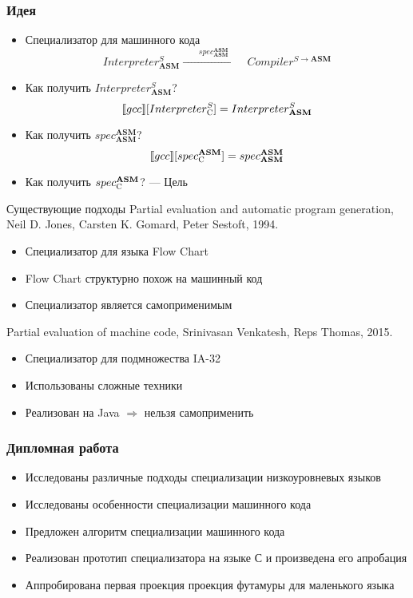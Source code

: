 \documentclass{beamer}
\begin{document}
\begin{frame}\frametitle{Идея}
  \begin{itemize}
  \item {Специализатор для машинного кода
      $$Interpreter^{S}_{\mathbf{ASM}}
      \xrightarrow{\qquad spec^{ \mathbf{ASM}}_{\mathbf{ASM}}\qquad} Compiler^{S \to \mathbf{ASM}}$$
    }
    \vfill
  \item {Как получить $Interpreter^{S}_{\mathbf{ASM}}$?
      $$\llbracket gcc \rrbracket [Interpreter^{S}_{\textsc{C}}] =
      Interpreter^{S}_{\mathbf{ASM}}$$}
    \vfill
  \item {Как получить $spec^{\mathbf{ASM}}_{\mathbf{ASM}}$?
      $$\llbracket gcc \rrbracket [spec^{ \mathbf{ASM}}_{\textsc{C}}] =
      spec^{\mathbf{ASM}}_{\mathbf{ASM}}$$}
    \vfill
  \item{Как получить $spec^{\mathbf{ASM}}_{\textsc{C}}$? \pause \hfill {\large \color{red} --- \hfill Цель} \hfill}
    \vfill
  \end{itemize}
\end{frame}

\begin{frame}{Существующие подходы}
	Partial evaluation and automatic program generation, 
	Neil D. Jones, Carsten K. Gomard, Peter Sestoft, 1994. 
    \begin{itemize}
    \vfill
    \item Специализатор для языка Flow Chart
    \vfill
    \item Flow Chart структурно похож на машинный код
    \vfill
    \item Специализатор является самоприменимым
  	\end{itemize}
  \vfill
    Partial evaluation of machine code,
    Srinivasan Venkatesh, Reps Thomas, 2015.
    \vfill
    \begin{itemize}
    \item Специализатор для подмножества IA-32
    \vfill
    \item Использованы сложные техники
    \vfill
    \item Реализован на Java $\Rightarrow$ нельзя самоприменить
  	\end{itemize}
\end{frame}

\begin{frame}[fragile]\frametitle{Дипломная работа}
\begin{itemize}
\item Исследованы различные подходы специализации низкоуровневых языков
\vfill
\item Исследованы особенности специализации машинного кода
\vfill
\item Предложен алгоритм специализации машинного кода
\vfill
\item Реализован прототип специализатора на языке С и произведена его апробация
\vfill
\item Аппробирована первая проекция проекция футамуры для маленького языка
\end{itemize}
\end{frame}
\end{document}
